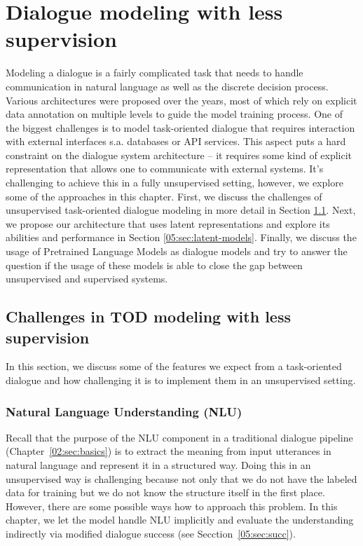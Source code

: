 \chapter{Dialogue modeling with less supervision}%
\label{chap:modeling}
Modeling a dialogue is a fairly complicated task that needs to handle communication in natural language as well as the discrete decision process.
Various architectures were proposed over the years, most of which rely on explicit data annotation on multiple levels to guide the model training process.
One of the biggest challenges is to model task-oriented dialogue that requires interaction with external interfaces s.a. databases or API services.
This aspect puts a hard constraint on the dialogue system architecture -- it requires some kind of explicit representation that allows one to communicate with external systems.
It's challenging to achieve this in a fully unsupervised setting, however, we explore some of the approaches in this chapter.
First, we discuss the challenges of unsupervised task-oriented dialogue modeling in more detail in Section \ref{05:sec:to-unsup}.
Next, we propose our architecture that uses latent representations and explore its abilities and performance in Section \ref{05:sec:latent-models}.
Finally, we discuss the usage of Pretrained Language Models as dialogue models and try to answer the question if the usage of these models is able to close the gap between unsupervised and supervised systems.

\section{Challenges in TOD modeling with less supervision}
\label{05:sec:to-unsup}
In this section, we discuss some of the features we expect from a task-oriented dialogue and how challenging it is to implement them in an unsupervised setting.

\subsection{Natural Language Understanding (NLU)}
Recall that the purpose of the NLU component in a traditional dialogue pipeline (Chapter~\ref{02:sec:basics}) is to extract the meaning from input utterances in natural language and represent it in a structured way.
Doing this in an unsupervised way is challenging because not only that we do not have the labeled data for training but we do not know the structure itself in the first place.
However, there are some possible ways how to approach this problem.
In this chapter, we let the model handle NLU implicitly and evaluate the understanding indirectly via modified dialogue success (see Secction~\ref{05:sec:succ}).

